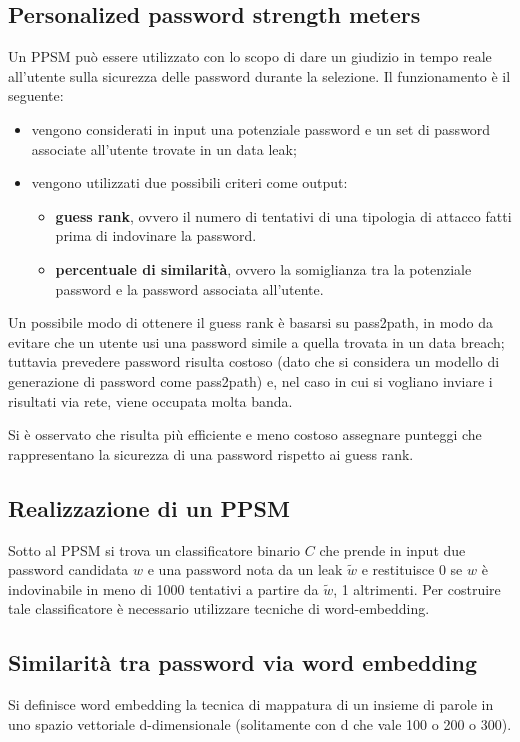 \subsection{Personalized password strength meters}
\label{sec:ppsm}
Un PPSM può essere utilizzato con lo scopo di dare un giudizio in tempo reale all'utente sulla sicurezza delle password durante la selezione.
Il funzionamento è il seguente:
\begin{itemize}
    \item vengono considerati in input una potenziale password e un set di password associate all'utente trovate in un data leak;
    \item vengono utilizzati due possibili criteri come output:
    \begin{itemize}
        \item \textbf{guess rank}, ovvero il numero di tentativi di una tipologia di attacco fatti prima di indovinare la password.
        \item \textbf{percentuale di similarità}, ovvero la somiglianza tra la potenziale password e la password associata all'utente.
    \end{itemize}
\end{itemize}

Un possibile modo di ottenere il guess rank è basarsi su pass2path, in modo da evitare che un utente usi una password simile a quella trovata in un data breach; tuttavia prevedere password risulta costoso (dato che si considera un modello di generazione di password come pass2path) e, nel caso in cui si vogliano inviare i risultati via rete, viene occupata molta banda.

Si è osservato che risulta più efficiente e meno costoso assegnare punteggi che rappresentano la sicurezza di una password rispetto ai guess rank.

\subsection{Realizzazione di un PPSM}
\label{sec:realizzazione ppsm}
Sotto al PPSM si trova un classificatore binario $C$ che prende in input due password candidata $w$ e una password nota da un leak $\tilde{w}$ e restituisce 0 se $w$ è indovinabile in meno di 1000 tentativi a partire da $\tilde{w}$, 1 altrimenti.
Per costruire tale classificatore è necessario utilizzare tecniche di word-embedding.

\subsection{Similarità tra password via word embedding}
\label{sec:similarita via word embedding}
Si definisce word embedding la tecnica di mappatura di un insieme di parole in uno spazio vettoriale d-dimensionale (solitamente con d che vale 100 o 200 o 300).

